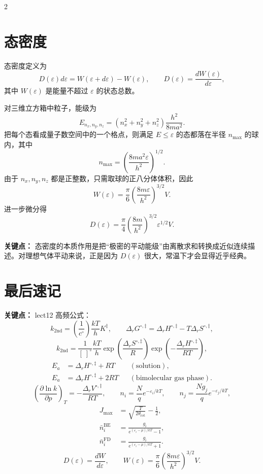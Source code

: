 \documentclass[a4paper,9pt]{article}
\newenvironment{keypoint}
{\par\vspace{0.3em}\noindent\begin{tcolorbox}[colback=keybg,colframe=keycolor,boxrule=0.5pt,arc=2pt,left=2pt,right=2pt,top=2pt,bottom=2pt,boxsep=0pt]\noindent\textcolor{keycolor}{\textbf{关键点：}}}
{\end{tcolorbox}\par\vspace{0.3em}}
\begin{document}
\begin{multicols}{2}
\section{态密度}

态密度定义为
\[
D(\varepsilon)d\varepsilon=W(\varepsilon+d\varepsilon)-W(\varepsilon),
\qquad
D(\varepsilon)=\frac{dW(\varepsilon)}{d\varepsilon},
\]
其中 $W(\varepsilon)$ 是能量不超过 $\varepsilon$ 的状态总数。

对三维立方箱中粒子，能级为
\[
E_{n_x,n_y,n_z}=(n_x^2+n_y^2+n_z^2)\frac{h^2}{8ma^2}.
\]
把每个态看成量子数空间中的一个格点，则满足 $E\le \varepsilon$ 的态都落在半径 $n_{\max}$ 的球内，其中
\[
n_{\max}=\left(\frac{8ma^2\varepsilon}{h^2}\right)^{1/2}.
\]
由于 $n_x,n_y,n_z$ 都是正整数，只需取球的正八分体体积，因此
\[
W(\varepsilon)=\frac{\pi}{6}\left(\frac{8m\varepsilon}{h^2}\right)^{3/2}V.
\]
进一步微分得
\[
D(\varepsilon)=\frac{\pi}{4}\left(\frac{8m}{h^2}\right)^{3/2}\varepsilon^{1/2}V.
\]

\begin{keypoint}
态密度的本质作用是把“极密的平动能级”由离散求和转换成近似连续描述。对理想气体平动来说，正是因为 $D(\varepsilon)$ 很大，常温下才会显得近乎经典。
\end{keypoint}

\section{最后速记}

\begin{keypoint}
lect12 高频公式：
\[
k_{2\mathrm{nd}}=\left(\frac{1}{c^\circ}\right)\frac{kT}{h}K^{\ddagger},
\qquad
\Delta_rG^{\circ,\ddagger}=\Delta_rH^{\circ,\ddagger}-T\Delta_rS^{\circ,\ddagger},
\]
\[
k_{2\mathrm{nd}}=\frac{1}{[\ ]^\circ}\frac{kT}{h}
\exp\left(\frac{\Delta_rS^{\circ,\ddagger}}{R}\right)
\exp\left(-\frac{\Delta_rH^{\circ,\ddagger}}{RT}\right),
\]
\[
\begin{aligned}
E_a&=\Delta_rH^{\circ,\ddagger}+RT && (\text{solution}),\\
E_a&=\Delta_rH^{\circ,\ddagger}+2RT && (\text{bimolecular gas phase}).
\end{aligned}
\]
\[
\left(\frac{\partial \ln k}{\partial p}\right)_T=-\frac{\Delta_rV^{\circ,\ddagger}}{RT},
\qquad
n_i=\frac{N}{q}e^{-\varepsilon_i/kT},
\qquad
n_j=\frac{Ng_j}{q}e^{-\varepsilon_j/kT},
\]
\[
\begin{aligned}
J_{\max}&=\sqrt{\frac{T}{2\theta_{\mathrm{rot}}}}-\frac{1}{2},\\
\bar n_i^{\mathrm{BE}}&=\frac{g_i}{e^{(\varepsilon_i-\mu)/kT}-1},\\
\bar n_i^{\mathrm{FD}}&=\frac{g_i}{e^{(\varepsilon_i-\mu)/kT}+1}.
\end{aligned}
\]
\[
D(\varepsilon)=\frac{dW}{d\varepsilon},
\qquad
W(\varepsilon)=\frac{\pi}{6}\left(\frac{8m\varepsilon}{h^2}\right)^{3/2}V.
\]
\end{keypoint}

\end{multicols}
\end{document}
